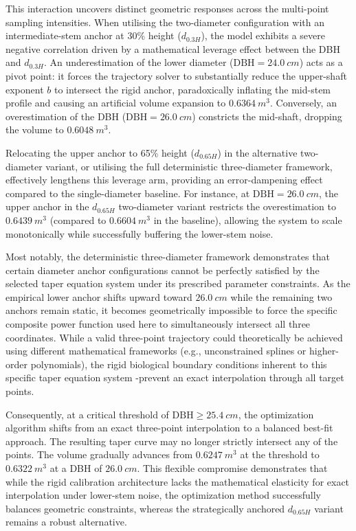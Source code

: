 \documentclass[twocolumn, bibliography=totoc]{scrartcl}
\begin{document}
This interaction uncovers distinct geometric responses across the multi-point sampling intensities. When utilising the two-diameter configuration with an intermediate-stem anchor at 30\% height ($d_{0.3H}$), the model exhibits a severe negative correlation driven by a mathematical leverage effect between the DBH and $d_{0.3H}$. An underestimation of the lower diameter ($\text{DBH} = \qty{24.0}{cm}$) acts as a pivot point: it forces the trajectory solver to substantially reduce the upper-shaft exponent $b$ to intersect the rigid anchor, paradoxically inflating the mid-stem profile and causing an artificial volume expansion to $\qty{0.6364}{m^3}$. Conversely, an overestimation of the DBH ($\text{DBH} = \qty{26.0}{cm}$) constricts the mid-shaft, dropping the volume to $\qty{0.6048}{m^3}$. 

Relocating the upper anchor to 65\% height ($d_{0.65H}$) in the alternative two-diameter variant, or utilising the full deterministic three-diameter framework, effectively lengthens this leverage arm, providing an error-dampening effect compared to the single-diameter baseline. For instance, at $\text{DBH} = \qty{26.0}{cm}$, the upper anchor in the $d_{0.65H}$ two-diameter variant restricts the overestimation to $\qty{0.6439}{m^3}$ (compared to $\qty{0.6604}{m^3}$ in the baseline), allowing the system to scale monotonically while successfully buffering the lower-stem noise.

Most notably, the deterministic three-diameter framework demonstrates that certain diameter anchor configurations cannot be perfectly satisfied by the selected taper equation system under its prescribed parameter constraints. As the empirical lower anchor shifts upward toward $\qty{26.0}{cm}$ while the remaining two anchors remain static, it becomes geometrically impossible to force the specific composite power function used here to simultaneously intersect all three coordinates. While a valid three-point trajectory could theoretically be achieved using different mathematical frameworks (e.g., unconstrained splines or higher-order polynomials), the rigid biological boundary conditions inherent to this specific taper equation system -prevent an exact interpolation through all target points.

Consequently, at a critical threshold of $\text{DBH} \ge \qty{25.4}{cm}$, the optimization algorithm shifts from an exact three-point interpolation to a balanced best-fit approach. The resulting taper curve may no longer strictly intersect any of the points. The volume gradually advances from $\qty{0.6247}{m^3}$ at the threshold to $\qty{0.6322}{m^3}$ at a DBH of $\qty{26.0}{cm}$. This flexible compromise demonstrates that while the rigid calibration architecture lacks the mathematical elasticity for exact interpolation under lower-stem noise, the optimization method successfully balances geometric constraints, whereas the strategically anchored $d_{0.65H}$ variant remains a robust alternative.
\end{document}
